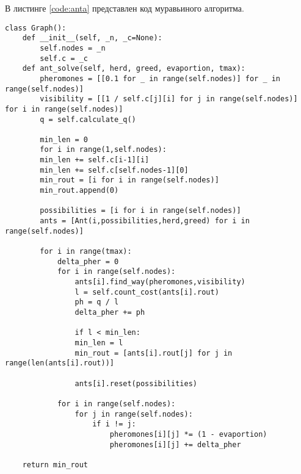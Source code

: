 \par В листинге \ref{code:anta} представлен код муравьиного алгоритма.
\begin{lstlisting}[caption= Муравьиный алгоритм, label=code:anta]
class Graph():
	def __init__(self, _n, _c=None):
		self.nodes = _n
		self.c = _c
	def ant_solve(self, herd, greed, evaportion, tmax):
		pheromones = [[0.1 for _ in range(self.nodes)] for _ in range(self.nodes)]
		visibility = [[1 / self.c[j][i] for j in range(self.nodes)] for i in range(self.nodes)]
		q = self.calculate_q()
		
		min_len = 0
		for i in range(1,self.nodes):
		min_len += self.c[i-1][i]
		min_len += self.c[self.nodes-1][0]
		min_rout = [i for i in range(self.nodes)]
		min_rout.append(0)
		
		possibilities = [i for i in range(self.nodes)]
		ants = [Ant(i,possibilities,herd,greed) for i in range(self.nodes)]
		
		for i in range(tmax):
			delta_pher = 0
			for i in range(self.nodes):
				ants[i].find_way(pheromones,visibility)
				l = self.count_cost(ants[i].rout)
				ph = q / l
				delta_pher += ph
				
				if l < min_len:
				min_len = l
				min_rout = [ants[i].rout[j] for j in range(len(ants[i].rout))]
				
				ants[i].reset(possibilities)
			
			for i in range(self.nodes):
				for j in range(self.nodes):
					if i != j:
						pheromones[i][j] *= (1 - evaportion)
						pheromones[i][j] += delta_pher
		
	return min_rout
\end{lstlisting}


